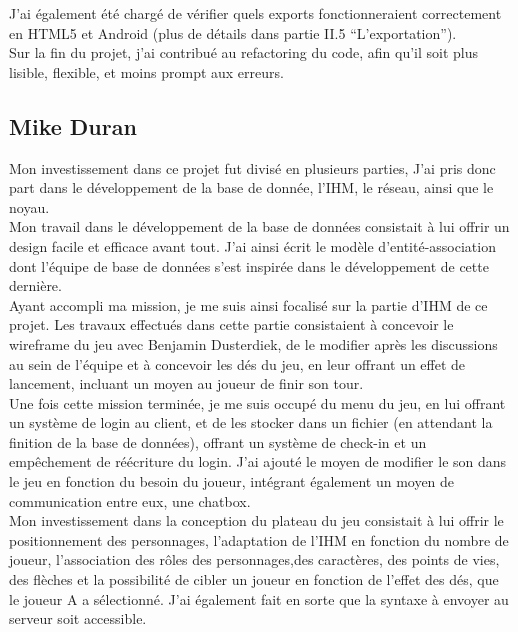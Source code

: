 \documentclass[a4paper,11pt]{article}
\begin{document}
    J’ai également été chargé de vérifier quels exports fonctionneraient  correctement en HTML5 et Android (plus de détails dans partie II.5 “L'exportation”). \\

    Sur la fin du projet, j’ai contribué au refactoring du code, afin qu’il soit plus lisible, flexible, et moins prompt aux erreurs. 

\subsection{Mike Duran}

	Mon investissement dans ce projet fut divisé en plusieurs parties, J'ai pris donc part dans le développement de la base de donnée, l'IHM, le réseau, ainsi que le noyau. \\

    Mon travail dans le développement de la base de données consistait à lui offrir un design facile et efficace avant tout. J'ai ainsi écrit le modèle d'entité-association dont l'équipe de base de données s'est inspirée dans le développement de cette dernière. \\

    Ayant accompli ma mission, je me suis ainsi focalisé sur la partie d'IHM de ce projet. Les travaux effectués dans cette partie consistaient à concevoir le wireframe du jeu avec Benjamin Dusterdiek, de le modifier après les discussions au sein de l'équipe et à concevoir les dés du jeu, en leur offrant un effet de lancement, incluant un moyen au joueur de finir son tour. \\

    Une fois cette mission terminée, je me suis occupé du menu du jeu, en lui offrant un système de login au client, et de les stocker dans un fichier (en attendant la finition de la base de données), offrant un système de check-in et un empêchement de réécriture du login.
    J'ai ajouté le moyen de modifier le son dans le jeu en fonction du besoin du joueur, intégrant également un moyen de communication entre eux, une chatbox. \\

    Mon investissement dans la conception du plateau du jeu consistait à lui offrir le positionnement des personnages, l'adaptation de l'IHM en fonction du nombre de joueur, l’association des rôles des personnages,des caractères, des points de vies, des flèches et la possibilité de cibler un joueur en fonction de l'effet des dés, que le joueur A a sélectionné. J’ai également fait en sorte que la syntaxe à envoyer au serveur soit accessible. \\
\end{document}
